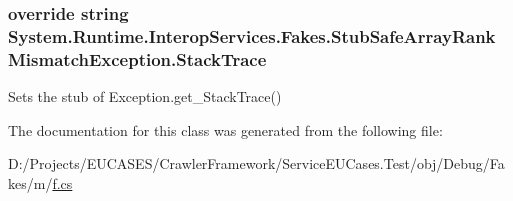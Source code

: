 \hypertarget{class_system_1_1_runtime_1_1_interop_services_1_1_fakes_1_1_stub_safe_array_rank_mismatch_exception_a611759702a1f6a2175ea87a0ea25b102}{
\subsubsection[{Stack\-Trace}]{\setlength{\rightskip}{0pt plus 5cm}override string System.\-Runtime.\-Interop\-Services.\-Fakes.\-Stub\-Safe\-Array\-Rank\-Mismatch\-Exception.\-Stack\-Trace\hspace{0.3cm}{\ttfamily [get]}}}\label{class_system_1_1_runtime_1_1_interop_services_1_1_fakes_1_1_stub_safe_array_rank_mismatch_exception_a611759702a1f6a2175ea87a0ea25b102}


Sets the stub of Exception.\-get\-\_\-\-Stack\-Trace()



The documentation for this class was generated from the following file\-:\begin{DoxyCompactItemize}
\item 
D\-:/\-Projects/\-E\-U\-C\-A\-S\-E\-S/\-Crawler\-Framework/\-Service\-E\-U\-Cases.\-Test/obj/\-Debug/\-Fakes/m/\hyperlink{m_2f_8cs}{f.\-cs}\end{DoxyCompactItemize}
